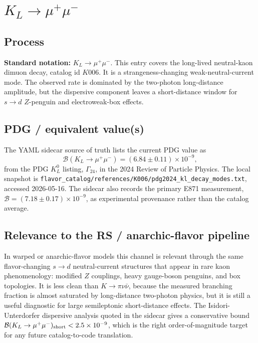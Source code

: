 
\section{\(K_L \to \mu^+\mu^-\)}

\subsection*{Process}
\textbf{Standard notation:} \(K_L\to\mu^+\mu^-\).  This entry covers the
long-lived neutral-kaon dimuon decay, catalog id \(K006\).  It is a
strangeness-changing weak-neutral-current mode.  The observed rate is dominated by
the two-photon long-distance amplitude, but the dispersive component leaves a
short-distance window for \(s\to d\) \(Z\)-penguin and electroweak-box effects.

\subsection*{PDG / equivalent value(s)}
The YAML sidecar source of truth lists the current PDG value as
\[
  \mathcal{B}(K_L\to\mu^+\mu^-)
  = (6.84 \pm 0.11)\times 10^{-9},
\]
from the PDG \(K_L^0\) listing, \(\Gamma_{24}\), in the 2024 Review of
Particle Physics.  The local snapshot is
\texttt{flavor\_catalog/references/K006/pdg2024\_kl\_decay\_modes.txt},
accessed 2026-05-16.  The sidecar also records the primary E871 measurement,
\(\mathcal{B}=(7.18\pm0.17)\times10^{-9}\), as experimental provenance rather
than the catalog average.

\subsection*{Relevance to the RS / anarchic-flavor pipeline}
In warped or anarchic-flavor models this channel is relevant through the same
flavor-changing \(s\to d\) neutral-current structures that appear in rare kaon
phenomenology: modified \(Z\) couplings, heavy gauge-boson penguins, and box
topologies.  It is less clean than \(K\to\pi\nu\bar\nu\), because the measured
branching fraction is almost saturated by long-distance two-photon physics, but
it is still a useful diagnostic for large semileptonic short-distance effects.
The Isidori-Unterdorfer dispersive analysis quoted in the sidecar gives a
conservative bound
\(\mathcal{B}(K_L\to\mu^+\mu^-)_{\rm short}<2.5\times10^{-9}\), which is the
right order-of-magnitude target for any future catalog-to-code translation.

